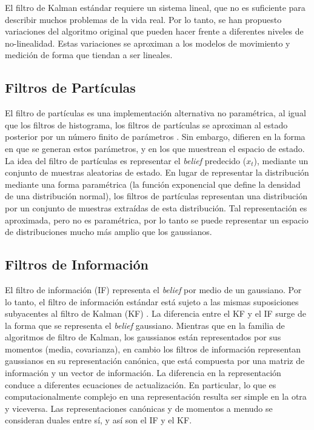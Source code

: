 El filtro de Kalman estándar requiere un sistema lineal, que no es suficiente para 
describir muchos problemas de la vida real. Por lo tanto, se han propuesto 
variaciones del algoritmo original que pueden hacer frente a diferentes niveles de 
no-linealidad. Estas variaciones se aproximan a los modelos de movimiento y medición 
de forma que tiendan a ser lineales.


\subsection{Filtros de Part\'iculas}
El filtro de part\'iculas es una implementaci\'on alternativa no param\'etrica, al igual 
que los filtros de histograma, los filtros de part\'iculas se aproximan al estado posterior 
por un n\'umero finito de par\'ametros \cite{arulampalam2002tutorial}. Sin embargo, difieren 
en la forma en que se generan estos par\'ametros, y en los que muestrean el espacio de 
estado. La idea del filtro de part\'iculas es representar el \textit{belief} predecido ($x_{t}$), 
mediante un conjunto de muestras aleatorias de estado. En lugar de representar la distribuci\'on 
mediante una forma param\'etrica (la funci\'on exponencial que define la densidad de una 
distribuci\'on normal), los filtros de part\'iculas representan una distribuci\'on por un 
conjunto de muestras extra\'idas de esta distribuci\'on. Tal representaci\'on es aproximada, pero 
no es param\'etrica, por lo tanto se puede representar un espacio de distribuciones mucho m\'as 
amplio que los gaussianos.


\subsection{Filtros de Informaci\'on}
El filtro de informaci\'on (IF) representa el \textit{belief} por medio de un gaussiano. Por lo 
tanto, el filtro de informaci\'on est\'andar est\'a sujeto a las mismas suposiciones subyacentes 
al filtro de Kalman (KF) \cite{thrun2005multi}. La diferencia entre el KF y el IF surge de la 
forma que se representa el \textit{belief} gaussiano. Mientras que en la familia de algoritmos 
de filtro de Kalman, los gaussianos est\'an representados por sus momentos (media, covarianza), en 
cambio los filtros de informaci\'on representan gaussianos en su representaci\'on can\'onica, que 
est\'a compuesta por una matriz de informaci\'on y un vector de informaci\'on. La diferencia en la 
representaci\'on conduce a diferentes ecuaciones de actualizaci\'on. En particular, lo que es 
computacionalmente complejo en una representaci\'on resulta ser simple en la otra y viceversa. Las 
representaciones can\'onicas y de momentos a menudo se consideran duales entre s\'i, y as\'i son el 
IF y el KF.

